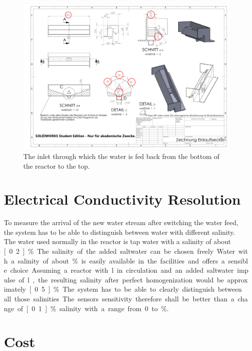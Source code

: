 \begin{figure}
	\begin{center}
		\includegraphics[width=\textwidth]{images/Einlaufbecken.pdf} 
		\caption{The inlet through which the water is fed back from the bottom of the reactor to the top.}
		\label{fig:elb}
	\end{center}
\end{figure}

\section{Electrical Conductivity Resolution}

To measure the arrival of the new water stream after switching the water feed, the system has to be able to distinguish between water with different salinity. The water used normally in the reactor is tap water with a salinity of about \unit[0.2]{\%}. The salinity of the added saltwater can be chosen freely. Water with a salinity of about \unit[5]{\%} is easily available in the facilities and offers a sensible choice. Assuming a reactor with \unit[65]{l} in circulation and an added saltwater impulse of \unit[5]{l}, the resulting salinity after perfect homogenization would be approximately \unit[0.5]{\%}. The system has to be able to clearly distinguish between all those salinities. The sensors sensitivity therefore shall be better than a change of \unit[0.1]{\%} salinity with a range from 0 to \unit[5]{\%}.

\section{Cost}

